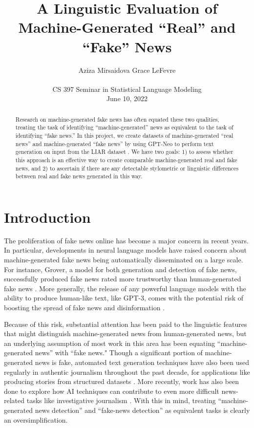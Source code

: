 \documentclass[11pt,a4paper]{article}
\title{A Linguistic Evaluation of Machine-Generated ``Real'' and ``Fake'' News}
\author{Aziza Mirsaidova \qquad Grace LeFevre\\
    \\
  CS 397 Seminar in Statistical Language Modeling\\
  June 10, 2022 \\}
\begin{document}
\maketitle
\begin{abstract}
Research on machine-generated fake news has often equated these two qualities, treating the task of identifying ``machine-generated'' news as equivalent to the task of identifying ``fake news.'' In this project, we create datasets of machine-generated ``real news'' and machine-generated ``fake news'' by using GPT-Neo \citep{gpt-neo} to perform text generation on input from the LIAR dataset \citep{wang2017liar}. We have two goals: 1) to assess whether this approach is an effective way to create comparable machine-generated real and fake news, and 2) to ascertain if there are any detectable stylometric or linguistic differences between real and fake news generated in this way. 
\end{abstract}

\section{Introduction}
The proliferation of fake news online has become a major concern in recent years. In particular, developments in neural language models have raised concern about machine-generated fake news being automatically disseminated on a large scale. For instance, Grover, a model for both generation and detection of fake news, successfully produced fake news rated more trustworthy than human-generated fake news \citep{zellers2019defending}. More generally, the release of any powerful language models with the ability to produce human-like text, like GPT-3, comes with the potential risk of boosting the spread of fake news and disinformation \citep{floridi2020gpt}.

Because of this risk, substantial attention has been paid to the linguistic features that might distinguish machine-generated news from human-generated news, but an underlying assumption of most work in this area has been equating ``machine-generated news'' with ``fake news." Though a significant portion of machine-generated news is fake, automated text generation techniques have also been used regularly in authentic journalism throughout the past decade, for applications like producing stories from structured datasets \citep{lecompte_2015}. More recently, work has also been done to explore how AI techniques can contribute to even more difficult news-related tasks like investigative journalism \citep{stray2019making}. With this in mind, treating ``machine-generated news detection'' and ``fake-news detection'' as equivalent tasks is clearly an oversimplification.
\end{document}

